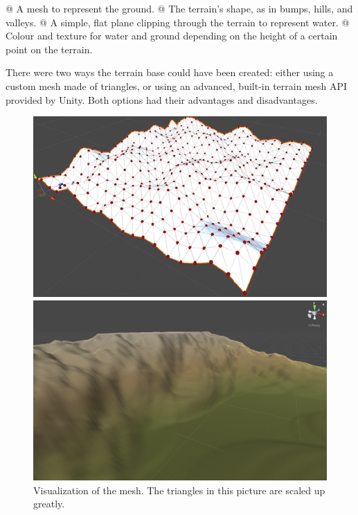 \begin{easylist}
 @ A mesh to represent the ground.
 @ The terrain's shape, as in bumps, hills, and valleys.
 @ A simple, flat plane clipping through the terrain to represent water.
 @ Colour and texture for water and ground depending on the height of a certain point on the terrain.
\end{easylist}

There were two ways the terrain base could have been created: either using a custom mesh made of triangles, or using an advanced, built-in terrain mesh API provided by Unity.
Both options had their advantages and disadvantages.

\begin{figure}[H]
  \centering
  \begin{minipage}{.45\textwidth}
    \centering
    \begin{minipage}{.9\textwidth}
      \centering
      \includegraphics[width=\textwidth]{figure/terrain_mesh.png}
      \caption{Visualization of the mesh. The triangles in this picture are scaled up greatly.}
      \label{fig:terrmesh}
    \end{minipage}
  \end{minipage}
  \begin{minipage}{.45\textwidth}
    \begin{minipage}{.9\textwidth}
      \centering
      \centering
      \includegraphics[width=\textwidth]{figure/terrain_API.png}

\end{minipage}
\end{minipage}
\end{figure}

